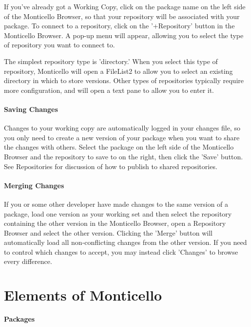 \documentclass[a4paper,10pt,twoside]{book}
\begin{document}
If you've already got a Working Copy, click on the package name on the left side of the Monticello Browser, so that your repository will be associated with your package. To connect to a repository, click on the '+Repository' button in the Monticello Browser. A pop-up menu will appear, allowing you to select the type of repository you want to connect to.

The simplest repository type is 'directory.' When you select this type of repository, Monticello will open a FileList2 to allow you to select an existing directory in which to store versions. Other types of repositories typically require more configuration, and will open a text pane to allow you to enter it.

\paragraph{Saving Changes}

Changes to your working copy are automatically logged in your changes file, so you only need to create a new version of your package when you want to share the changes with others. Select the package on the left side of the Monticello Browser and the repository to save to on the right, then click the 'Save' button. See Repositories for discussion of how to publish to shared repositories.

\paragraph{Merging Changes}

If you or some other developer have made changes to the same version of a package, load one version as your working set and then select the repository containing the other version in the Monticello Browser, open a Repository Browser and select the other version. Clicking the 'Merge' button will automatically load all non-conflicting changes from the other version. If you need to control which changes to accept, you may instead click 'Changes' to browse every difference.



\section{Elements of Monticello}

\paragraph{Packages}
\end{document}
